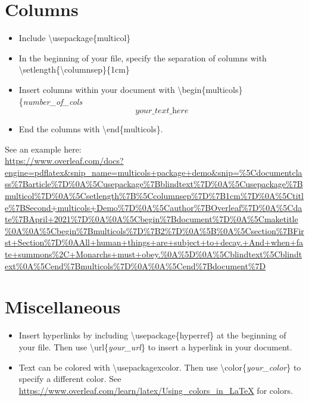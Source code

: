 \documentclass{article}
\begin{document}
\section*{Columns}
\begin{itemize}
    \item Include \textbackslash usepackage\{multicol\}
    \item In the beginning of your file, specify the separation of columns with \textbackslash setlength\{\textbackslash columnsep\}\{1cm\}
    \item Insert columns within your document with \textbackslash begin\{multicols\}\{\textit{number\_of\_cols}\[\textit{your\_text\_here}\]
    \item End the columns with \textbackslash end\{multicols\}.
\end{itemize}
\par See an example here: \\
\url{https://www.overleaf.com/docs?engine=pdflatex&snip_name=multicols+package+demo&snip=%5Cdocumentclass%7Barticle%7D%0A%5Cusepackage%7Bblindtext%7D%0A%5Cusepackage%7Bmulticol%7D%0A%5Csetlength%7B%5Ccolumnsep%7D%7B1cm%7D%0A%5Ctitle%7BSecond+multicols+Demo%7D%0A%5Cauthor%7BOverleaf%7D%0A%5Cdate%7BApril+2021%7D%0A%0A%5Cbegin%7Bdocument%7D%0A%5Cmaketitle%0A%0A%5Cbegin%7Bmulticols%7D%7B2%7D%0A%5B%0A%5Csection%7BFirst+Section%7D%0AAll+human+things+are+subject+to+decay.+And+when+fate+summons%2C+Monarchs+must+obey.%0A%5D%0A%5Cblindtext%5Cblindtext%0A%5Cend%7Bmulticols%7D%0A%0A%5Cend%7Bdocument%7D}

\section*{Miscellaneous}
\begin{itemize}
    \item Insert hyperlinks by including \textbackslash usepackage\{hyperref\} at the beginning of your file. Then use \textbackslash url\{\textit{your\_url}\} to insert a hyperlink in your document.
    \item Text can be colored with \textbackslash usepackage{xcolor}. Then use \textbackslash color\{\textit{your\_color}\} to specify a different color. See \url{https://www.overleaf.com/learn/latex/Using_colors_in_LaTeX} for colors.
\end{itemize}
\end{document}

